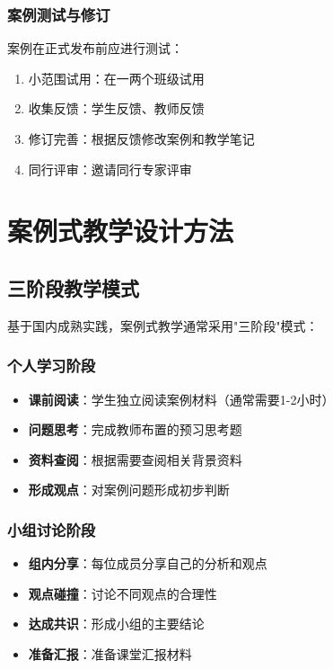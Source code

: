 \documentclass[12pt,a4paper]{ctexart}
\begin{document}
\subsubsection{案例测试与修订}

案例在正式发布前应进行测试：
\begin{enumerate}[leftmargin=2em]
    \item 小范围试用：在一两个班级试用
    \item 收集反馈：学生反馈、教师反馈
    \item 修订完善：根据反馈修改案例和教学笔记
    \item 同行评审：邀请同行专家评审
\end{enumerate}

\section{案例式教学设计方法}

\subsection{三阶段教学模式}

基于国内成熟实践，案例式教学通常采用"三阶段"模式：

\subsubsection{个人学习阶段}

\begin{itemize}[leftmargin=2em]
    \item \textbf{课前阅读}：学生独立阅读案例材料（通常需要1-2小时）
    \item \textbf{问题思考}：完成教师布置的预习思考题
    \item \textbf{资料查阅}：根据需要查阅相关背景资料
    \item \textbf{形成观点}：对案例问题形成初步判断
\end{itemize}

\subsubsection{小组讨论阶段}

\begin{itemize}[leftmargin=2em]
    \item \textbf{组内分享}：每位成员分享自己的分析和观点
    \item \textbf{观点碰撞}：讨论不同观点的合理性
    \item \textbf{达成共识}：形成小组的主要结论
    \item \textbf{准备汇报}：准备课堂汇报材料
\end{itemize}
\end{document}
